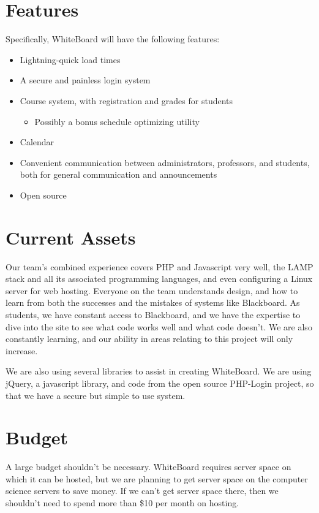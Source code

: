 \documentclass{article}
\begin{document}
\section{Features}

Specifically, WhiteBoard will have the following features:
\begin{itemize}
    \item Lightning-quick load times
    \item A secure and painless login system
    \item Course system, with registration and grades for students
        \begin{itemize}
            \item Possibly a bonus schedule optimizing utility
        \end{itemize}
    \item Calendar
    \item Convenient communication between administrators, professors, and
        students, both for general communication and announcements
    \item Open source
\end{itemize}

\section{Current Assets}

Our team’s combined experience covers PHP and Javascript very well, the
LAMP stack and all its associated programming languages, and even
configuring a Linux server for web hosting. Everyone on the team
understands design, and how to learn from both the successes and the
mistakes of systems like Blackboard. As students, we have constant access
to Blackboard, and we have the expertise to dive into the site to see what
code works well and what code doesn’t. We are also constantly learning, and
our ability in areas relating to this project will only increase.

We are also using several libraries to assist in creating WhiteBoard. We
are using jQuery, a javascript library, and code from the open source
PHP-Login project, so that we have a secure but simple to use system.

\section{Budget}
A large budget shouldn’t be necessary. WhiteBoard requires server space on
which it can be hosted, but we are planning to get server space on the computer
science servers to save money. If we can’t get server space there, then we
shouldn’t need to spend more than \$10 per month on hosting.
\end{document}
